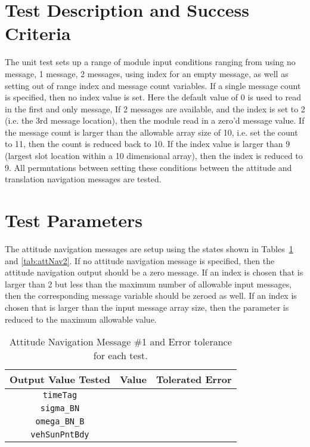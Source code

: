 
\section{Test Description and Success Criteria}
The unit test sets up a range of module input conditions ranging from using no message, 1 message, 2 messages,  using index for an empty message, as well as setting out of range index and message count variables.  If a single message count is specified, then no index value is set.  Here the default value of 0 is used to read in the first and only message,  If 2 messages are available, and the index is set to 2 (i.e. the 3rd message location), then the module read in a zero'd message value.  If the message count is larger than the allowable array size of 10, i.e. set the count to 11, then the count is reduced back to 10. If the index value is larger than 9 (largest slot location within a 10 dimensional array), then the index is reduced to 9.   All permutations between setting these conditions between the attitude and translation navigation messages are tested. 




\section{Test Parameters}

The attitude navigation messages are setup using the states shown in Tables~\ref{tab:attNav1} and \ref{tab:attNav2}.  If no attitude navigation message is specified, then the attitude navigation output should be a zero message.  If an index is chosen that is larger than 2 but less than the maximum number of allowable input messages, then the corresponding message variable should be zeroed as well.  If an index is chosen that is larger than the input message array size, then the parameter is reduced to the maximum allowable value.

\begin{table}[htbp]
	\caption{Attitude Navigation Message \#1 and Error tolerance for each test.}
	\label{tab:attNav1}
	\centering \fontsize{10}{10}\selectfont
	\begin{tabular}{ c | c | c } %
		\hline\hline
		\textbf{Output Value Tested} & \textbf{Value} & \textbf{Tolerated Error}  \\ 
		\hline
		{\tt timeTag}  &       & 	   \\ 
		{\tt sigma\_BN}  &       & 	   \\ 
		{\tt omega\_BN\_B}  &       & 	   \\ 
		{\tt vehSunPntBdy}  &       & 	   \\ 
		\hline\hline
	\end{tabular}
\end{table}

